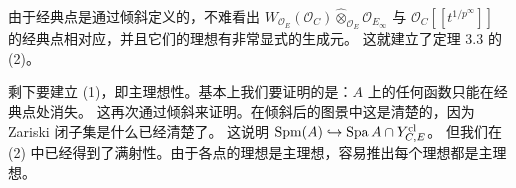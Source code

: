 由于经典点是通过倾斜定义的，不难看出
$W_{\mathcal{O}_E}(\mathcal{O}_C)\widehat{\otimes}_{\mathcal{O}_E}\mathcal{O}_{E_\infty}$
与 $\mathcal{O}_C[[t^{1/p^\infty}]]$ 的经典点相对应，并且它们的理想有非常显式的生成元。
这就建立了定理 3.3 的 (2)。

剩下要建立 (1)，即主理想性。基本上我们要证明的是：$A$ 上的任何函数只能在经典点处消失。
这再次通过倾斜来证明。在倾斜后的图景中这是清楚的，因为 Zariski 闭子集是什么已经清楚了。
这说明 $\mathrm{Spm}(A)\hookrightarrow\operatorname{Spa} A\cap Y^{\mathrm{cl}}_{C,E}$。
但我们在 (2) 中已经得到了满射性。由于各点的理想是主理想，容易推出每个理想都是主理想。

